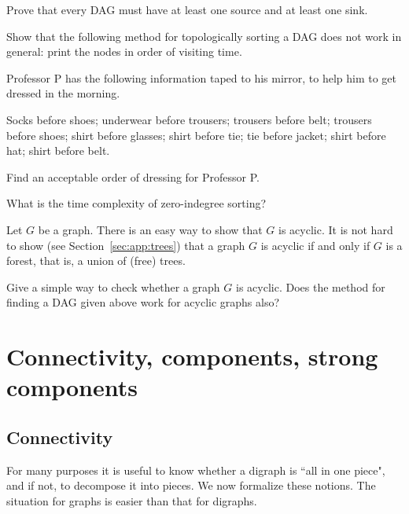 \begin{Exercise}
\label{ex:DAG-sink}
Prove that every DAG must have at least one source and at least one sink.
\end{Exercise}

\begin{Exercise}
\label{ex:sillytopsort}
Show that the following method for topologically sorting a DAG does not work in 
general: print the nodes in order of visiting time.
\end{Exercise}

\begin{Exercise} 
\label{ex:profP}
Professor P has the following information taped to his mirror, to help
him to get dressed in the morning.

Socks before shoes; underwear before trousers; trousers before belt;
trousers before shoes; shirt before glasses; shirt before tie; tie
before jacket; shirt before hat; shirt before belt.

Find an acceptable order of dressing for Professor P.
\end{Exercise}

\begin{Exercise}
\label{ex:zero-indeg-runtime}
What is the time complexity of zero-indegree sorting? 
\end{Exercise}


\begin{Exercise}
\label{ex:forest}
Let $G$ be a graph. There is an easy way to show that $G$ is acyclic.
It is not hard to show (see Section~\ref{sec:app:trees}) that a graph $G$ is 
acyclic if and only if $G$ is a forest, that is, a union of (free) trees.

Give a simple way to check whether a graph $G$ is acyclic. Does the method 
for finding a DAG given above work for acyclic graphs also?
\end{Exercise}

\chapter{Connectivity, components, strong components}

\section{Connectivity}
\label{sec:connectivity}

For many purposes it is useful to know whether a digraph is ``all in one
piece", and if not, to decompose it into pieces. We now formalize these
notions. The situation for graphs is easier than that for digraphs.

